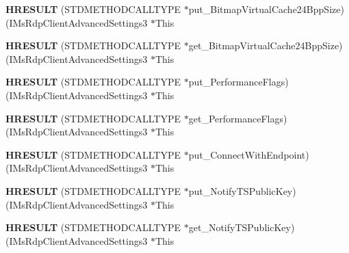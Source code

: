\begin{DoxyCompactItemize}
{\bfseries H\+R\+E\+S\+U\+LT} (S\+T\+D\+M\+E\+T\+H\+O\+D\+C\+A\+L\+L\+T\+Y\+PE $\ast$put\+\_\+\+Bitmap\+Virtual\+Cache24\+Bpp\+Size)(I\+Ms\+Rdp\+Client\+Advanced\+Settings3 $\ast$This
\item 
\mbox{\label{struct_i_ms_rdp_client_advanced_settings3_vtbl_a59f5044571d1b0a990af43f79119cde2}} 
{\bfseries H\+R\+E\+S\+U\+LT} (S\+T\+D\+M\+E\+T\+H\+O\+D\+C\+A\+L\+L\+T\+Y\+PE $\ast$get\+\_\+\+Bitmap\+Virtual\+Cache24\+Bpp\+Size)(I\+Ms\+Rdp\+Client\+Advanced\+Settings3 $\ast$This
\item 
\mbox{\label{struct_i_ms_rdp_client_advanced_settings3_vtbl_a62cda8dce52b39471500cece01ddea9e}} 
{\bfseries H\+R\+E\+S\+U\+LT} (S\+T\+D\+M\+E\+T\+H\+O\+D\+C\+A\+L\+L\+T\+Y\+PE $\ast$put\+\_\+\+Performance\+Flags)(I\+Ms\+Rdp\+Client\+Advanced\+Settings3 $\ast$This
\item 
\mbox{\label{struct_i_ms_rdp_client_advanced_settings3_vtbl_a12c3989b30e52c085f5e90bb4e229444}} 
{\bfseries H\+R\+E\+S\+U\+LT} (S\+T\+D\+M\+E\+T\+H\+O\+D\+C\+A\+L\+L\+T\+Y\+PE $\ast$get\+\_\+\+Performance\+Flags)(I\+Ms\+Rdp\+Client\+Advanced\+Settings3 $\ast$This
\item 
\mbox{\label{struct_i_ms_rdp_client_advanced_settings3_vtbl_af0e1a800a228b900f878c006caeb8e63}} 
{\bfseries H\+R\+E\+S\+U\+LT} (S\+T\+D\+M\+E\+T\+H\+O\+D\+C\+A\+L\+L\+T\+Y\+PE $\ast$put\+\_\+\+Connect\+With\+Endpoint)(I\+Ms\+Rdp\+Client\+Advanced\+Settings3 $\ast$This
\item 
\mbox{\label{struct_i_ms_rdp_client_advanced_settings3_vtbl_ac20c73e5203f978437d23a582f2ff696}} 
{\bfseries H\+R\+E\+S\+U\+LT} (S\+T\+D\+M\+E\+T\+H\+O\+D\+C\+A\+L\+L\+T\+Y\+PE $\ast$put\+\_\+\+Notify\+T\+S\+Public\+Key)(I\+Ms\+Rdp\+Client\+Advanced\+Settings3 $\ast$This
\item 
\mbox{\label{struct_i_ms_rdp_client_advanced_settings3_vtbl_a1ddd91f24a183484fe7829c7759b03d7}} 
{\bfseries H\+R\+E\+S\+U\+LT} (S\+T\+D\+M\+E\+T\+H\+O\+D\+C\+A\+L\+L\+T\+Y\+PE $\ast$get\+\_\+\+Notify\+T\+S\+Public\+Key)(I\+Ms\+Rdp\+Client\+Advanced\+Settings3 $\ast$This

\end{DoxyCompactItemize}
